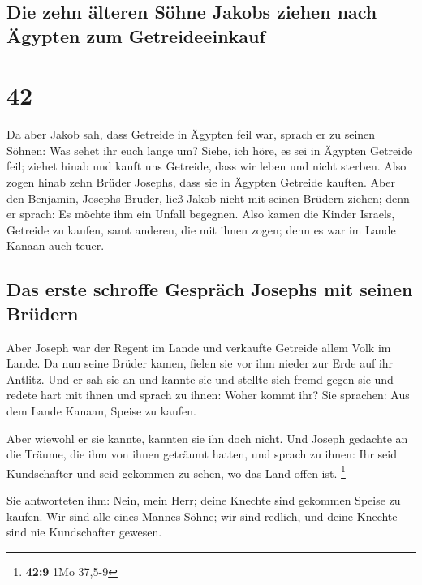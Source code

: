 \hypertarget{die-zehn-uxe4lteren-suxf6hne-jakobs-ziehen-nach-uxe4gypten-zum-getreideeinkauf}{%
\subsection{Die zehn älteren Söhne Jakobs ziehen nach Ägypten zum
Getreideeinkauf}\label{die-zehn-uxe4lteren-suxf6hne-jakobs-ziehen-nach-uxe4gypten-zum-getreideeinkauf}}

\hypertarget{section-41}{%
\section{42}\label{section-41}}

 Da aber Jakob sah, dass Getreide in Ägypten feil war,
sprach er zu seinen Söhnen: Was sehet ihr euch lange um? 
Siehe, ich höre, es sei in Ägypten Getreide feil; ziehet hinab und kauft
uns Getreide, dass wir leben und nicht sterben.  Also
zogen hinab zehn Brüder Josephs, dass sie in Ägypten Getreide kauften.
 Aber den Benjamin, Josephs Bruder, ließ Jakob nicht mit
seinen Brüdern ziehen; denn er sprach: Es möchte ihm ein Unfall
begegnen.  Also kamen die Kinder Israels, Getreide zu
kaufen, samt anderen, die mit ihnen zogen; denn es war im Lande Kanaan
auch teuer.

\hypertarget{das-erste-schroffe-gespruxe4ch-josephs-mit-seinen-bruxfcdern}{%
\subsection{Das erste schroffe Gespräch Josephs mit seinen
Brüdern}\label{das-erste-schroffe-gespruxe4ch-josephs-mit-seinen-bruxfcdern}}

 Aber Joseph war der Regent im Lande und verkaufte
Getreide allem Volk im Lande. Da nun seine Brüder kamen, fielen sie vor
ihm nieder zur Erde auf ihr Antlitz.  Und er sah sie an
und kannte sie und stellte sich fremd gegen sie und redete hart mit
ihnen und sprach zu ihnen: Woher kommt ihr? Sie sprachen: Aus dem Lande
Kanaan, Speise zu kaufen.

 Aber wiewohl er sie kannte, kannten sie ihn doch nicht.
 Und Joseph gedachte an die Träume, die ihm von ihnen
geträumt hatten, und sprach zu ihnen: Ihr seid Kundschafter und seid
gekommen zu sehen, wo das Land offen ist. \footnote{\textbf{42:9} 1Mo
  37,5-9}

 Sie antworteten ihm: Nein, mein Herr; deine Knechte sind
gekommen Speise zu kaufen.  Wir sind alle eines Mannes
Söhne; wir sind redlich, und deine Knechte sind nie Kundschafter
gewesen.

